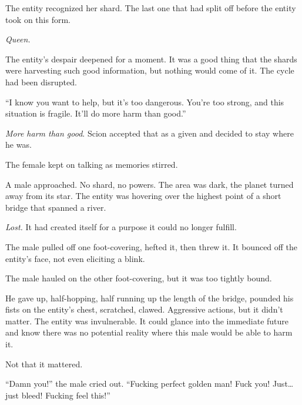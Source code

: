 The entity recognized her shard.  The last one that had split off before the entity took on this form.



\emph{Queen.}



The entity's despair deepened for a moment.  It was a good thing that the shards were harvesting such good information, but nothing would come of it.  The cycle had been disrupted.



``I know you want to help, but it's too dangerous.  You're too strong, and this situation is fragile.  It'll do more harm than good.''



\emph{More harm than good}.  Scion accepted that as a given and decided to stay where he was.



The female kept on talking as memories stirred.



\sectionbreak



A male approached.  No shard, no powers.  The area was dark, the planet turned away from its star.  The entity was hovering over the highest point of a short bridge that spanned a river.



\emph{Lost.}  It had created itself for a purpose it could no longer fulfill.



The male pulled off one foot-covering, hefted it, then threw it.  It bounced off the entity's face, not even eliciting a blink.



The male hauled on the other foot-covering, but it was too tightly bound.



He gave up, half-hopping, half running up the length of the bridge, pounded his fists on the entity's chest, scratched, clawed.  Aggressive actions, but it didn't matter.  The entity was invulnerable.  It could glance into the immediate future and know there was no potential reality where this male would be able to harm it.



Not that it mattered.



``Damn you!'' the male cried out.  ``Fucking perfect golden man!  Fuck you!  Just\ldots just bleed!  Fucking feel this!''



